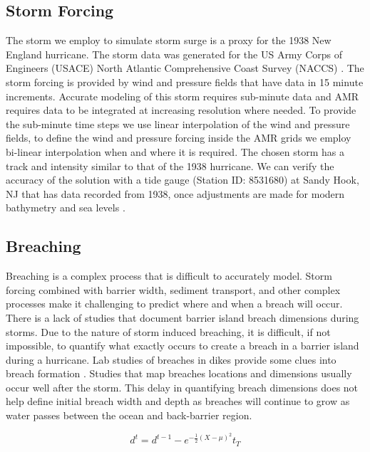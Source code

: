 \documentclass{coastal_paper}
\begin{document}
\subsection{Storm Forcing}
The storm we employ to simulate storm surge is a proxy for the 1938 New England hurricane. The storm data was generated for the US Army Corps of Engineers (USACE) North Atlantic Comprehensive Coast Survey (NACCS) \citep{cialone2015north}. The storm forcing is provided by wind and pressure fields that have data in 15 minute increments. Accurate modeling of this storm requires sub-minute data and AMR requires data to be integrated at increasing resolution where needed. To provide the sub-minute time steps we use linear interpolation of the wind and pressure fields, to define the wind and pressure forcing inside the AMR grids we employ bi-linear interpolation when and where it is required. The chosen storm has a track and intensity similar to that of the 1938 hurricane. We can verify the accuracy of the solution with a tide gauge (Station ID: 8531680) at Sandy Hook, NJ that has data recorded from 1938, once adjustments are made for modern bathymetry and sea levels \citep{coops2007}. 

\subsection{Breaching}
Breaching is a complex process that is difficult to accurately model. Storm forcing combined with barrier width, sediment transport, and other complex processes make it challenging to predict where and when a breach will occur. There is a lack of studies that document barrier island breach dimensions during storms. Due to the nature of storm induced breaching, it is difficult, if not impossible, to quantify what exactly occurs to create a breach in a barrier island during a hurricane. Lab studies of breaches in dikes provide some clues into breach formation \citep{Visser1999}. Studies that map breaches locations and dimensions usually occur well after the storm. This delay in quantifying breach dimensions does not help define initial breach width and depth as breaches will continue to grow as water passes between the ocean and back-barrier region.

\begin{equation}
    d^t = d^{t-1} - e^{-\frac{1}{2}{(X - \mu)^2}}t_T
    \label{eq:breach_gaussian}
\end{equation}
\end{document}
